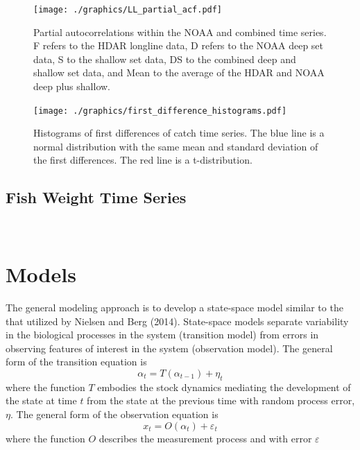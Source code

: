\documentclass[12pt,letterpaper]{article}
\newcommand\help[1]{\color{Magenta}{\it #1 }\normalcolor}
\begin{document}
\begin{figure}
\begin{center}
\texttt{[image: ./graphics/LL\_partial\_acf.pdf]}
\caption{\label{fig:LLpartialacf}
Partial autocorrelations within the NOAA and combined time
series. F refers to the HDAR longline data, D refers to the NOAA deep
set data, S to the shallow set data,
DS to the combined deep and shallow set data, and Mean to the average
of the HDAR and NOAA deep plus shallow.
}
\end{center}
\end{figure}

\begin{figure}
\begin{center}
\texttt{[image: ./graphics/first\_difference\_histograms.pdf]}
\caption{\label{fig:diff1histo}
Histograms of first differences of catch time series. The blue line is
a normal distribution with the same mean and standard deviation of the
first differences. The red line is a t-distribution.}
\end{center}
\end{figure}


\clearpage
\subsection*{Fish Weight Time Series}
~

\centerline{\help{Not yet available.}}

\section*{Models}
The general modeling approach is to develop a state-space model
similar to the that utilized by Nielsen and Berg (2014).
State-space models separate variability in the biological
processes in the system (transition model)
from errors in observing features of interest
in the system (observation model). 
The general form of the transition equation is
\begin{equation}
\alpha_t=T(\alpha_{t-1}) + \eta_t
\end{equation}
where the function $T$ embodies the stock dynamics mediating the
development of the state at time $t$ from the state at the previous
time with random process error, $\eta$.
The general form of the observation equation is
\begin{equation}
x_t = O(\alpha_t) + \varepsilon_t
\end{equation}
where the function $O$ describes the measurement process and with
error $\varepsilon$
\end{document}
